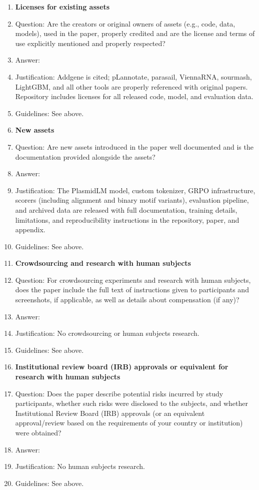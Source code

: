 \begin{enumerate}
\item {\bf Licenses for existing assets}
    \item[] Question: Are the creators or original owners of assets (e.g., code, data, models), used in the paper, properly credited and are the license and terms of use explicitly mentioned and properly respected?
    \item[] Answer: \answerYes{}
    \item[] Justification: Addgene is cited; pLannotate, parasail, ViennaRNA, sourmash, LightGBM, and all other tools are properly referenced with original papers. Repository includes licenses for all released code, model, and evaluation data.
    \item[] Guidelines: See above.

\item {\bf New assets}
    \item[] Question: Are new assets introduced in the paper well documented and is the documentation provided alongside the assets?
    \item[] Answer: \answerYes{}
    \item[] Justification: The PlasmidLM model, custom tokenizer, GRPO infrastructure, scorers (including alignment and binary motif variants), evaluation pipeline, and archived data are released with full documentation, training details, limitations, and reproducibility instructions in the repository, paper, and appendix.
    \item[] Guidelines: See above.

\item {\bf Crowdsourcing and research with human subjects}
    \item[] Question: For crowdsourcing experiments and research with human subjects, does the paper include the full text of instructions given to participants and screenshots, if applicable, as well as details about compensation (if any)? 
    \item[] Answer: \answerNA{}
    \item[] Justification: No crowdsourcing or human subjects research.
    \item[] Guidelines: See above.

\item {\bf Institutional review board (IRB) approvals or equivalent for research with human subjects}
    \item[] Question: Does the paper describe potential risks incurred by study participants, whether such risks were disclosed to the subjects, and whether Institutional Review Board (IRB) approvals (or an equivalent approval/review based on the requirements of your country or institution) were obtained?
    \item[] Answer: \answerNA{}
    \item[] Justification: No human subjects research.
    \item[] Guidelines: See above.


\end{enumerate}
